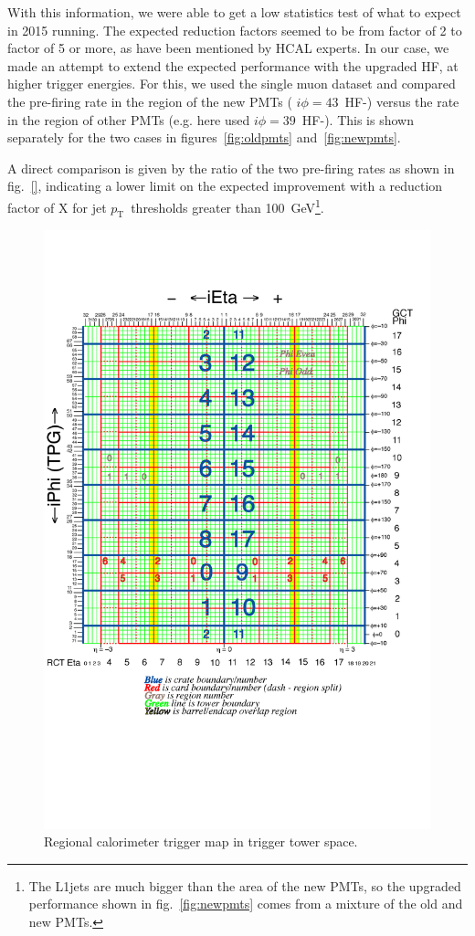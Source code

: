 \documentclass[11pt]{cmspaperpdf}
\newcommand{\pt}{\ensuremath{p_{\textrm{T}}}}
\begin{document}
With this information, we were able to get a low statistics test of what to expect in 2015 running. The expected reduction factors seemed to be from factor of 2 to factor of 5 or more, as have been mentioned by HCAL experts.
In our case, we made an attempt to extend the expected performance with the upgraded HF, at higher trigger energies. For this, we used the single muon dataset and compared the pre-firing rate in the region of the new PMTs ( $i \phi=43$~HF-) versus the rate in the region of other PMTs (e.g. here used  $i \phi=39$~HF-). This is shown separately for the two cases in figures~\ref{fig:oldpmts} and~\ref{fig:newpmts}. 

A direct comparison is given by the ratio of the two pre-firing rates as shown in fig.~\ref{}, indicating a lower limit on the expected improvement with a reduction factor of X for jet \pt~thresholds greater than 100~GeV\footnote{The L1jets are much bigger than the area of the new PMTs, so the upgraded performance shown in fig.~\ref{fig:newpmts} comes from  a mixture of the old and new PMTs.}.

\begin{figure}
\centering
\includegraphics[scale=0.23]{plots/towers_ieta_iphi_2009.png}
\caption{Regional calorimeter trigger map in trigger tower space.} 
\end{figure}
\vspace{5mm}
\end{document}
